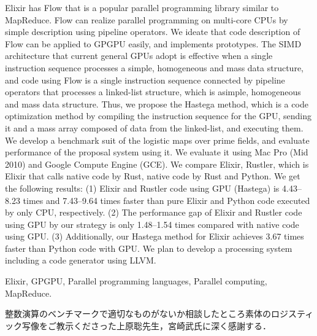 \documentclass[submit,techrep]{ipsj}
\begin{document}
\begin{eabstract}
Elixir has Flow that is a popular parallel programming library similar to MapReduce. Flow can realize parallel programming on multi-core CPUs by simple description using pipeline operators. We ideate that code description of Flow can be applied to GPGPU easily, and implements prototypes. The SIMD architecture that current general GPUs adopt is effective when a single instruction sequence processes a simple, homogeneous and mass data structure, and code using Flow is a single instruction sequence connected by pipeline operators that processes a linked-list structure, which is asimple, homogeneous and mass data structure. Thus, we propose the Hastega method, which is a code optimization method by compiling the instruction sequence for the GPU, sending it and a mass array composed of data from the linked-list, and executing them. We develop a benchmark suit of the logistic maps over prime fields, and evaluate performance of the proposal system using it. We evaluate it using Mac Pro (Mid 2010) and Google Compute Engine (GCE). We compare Elixir, Rustler, which is Elixir that calls native code by Rust, native code by Rust and Python. We get the following results: (1) Elixir and Rustler code using GPU (Hastega) is 4.43--8.23 times and 7.43--9.64 times faster than pure Elixir and Python code executed by only CPU, respectively. (2) The performance gap of Elixir and Rustler code using GPU by our strategy is only 1.48--1.54 times compared with native code using GPU. (3) Additionally, our Hastega method for Elixir achieves 3.67 times faster than Python code with GPU. We plan to develop a processing system including a code generator using LLVM.
\end{eabstract}

\begin{ekeyword}
Elixir, GPGPU, Parallel programming languages, Parallel computing, MapReduce.
\end{ekeyword}

\maketitle



\begin{acknowledgment}
整数演算のベンチマークで適切なものがないか相談したところ素体のロジスティック写像\cite{Miyazaki14}をご教示くださった上原聡先生，宮崎武氏に深く感謝する．
\end{acknowledgment}




\end{document}
